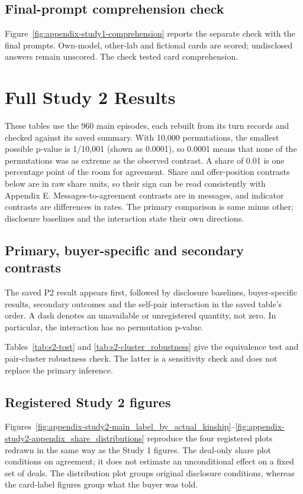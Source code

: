 \subsection{Final-prompt comprehension check}
\label{subapp:final-prompt-comprehension-check}
Figure~\ref{fig:appendix-study1-comprehension} reports the separate check with the final prompts. Own-model, other-lab and fictional cards are scored; undisclosed answers remain unscored. The check tested card comprehension.


\section{Full Study 2 Results}
\label{app:study2-results}
These tables use the 960 main episodes, each rebuilt from its turn records and checked against its saved summary. With 10,000 permutations, the smallest possible p-value is 1/10,001 (shown as 0.0001), so 0.0001 means that none of the permutations was as extreme as the observed contrast. A share of 0.01 is one percentage point of the room for agreement. Share and offer-position contrasts below are in raw share units, so their sign can be read consistently with Appendix E. Messages-to-agreement contrasts are in messages, and indicator contrasts are differences in rates. The primary comparison is same minus other; disclosure baselines and the interaction state their own directions.

\subsection{Primary, buyer-specific and secondary contrasts}
\label{subapp:primary-buyer-specific-and-secondary-contrasts}
The saved P2 result appears first, followed by disclosure baselines, buyer-specific results, secondary outcomes and the self-pair interaction in the saved table's order. A dash denotes an unavailable or unregistered quantity, not zero. In particular, the interaction has no permutation p-value.


Tables~\ref{tab:s2-tost} and \ref{tab:s2-cluster_robustness} give the equivalence test and pair-cluster robustness check. The latter is a sensitivity check and does not replace the primary inference.

\subsection{Registered Study 2 figures}
\label{subapp:registered-study-2-figures}
Figures~\ref{fig:appendix-study2-main_label_by_actual_kinship}--\ref{fig:appendix-study2-appendix_share_distributions} reproduce the four registered plots redrawn in the same way as the Study 1 figures. The deal-only share plot conditions on agreement; it does not estimate an unconditional effect on a fixed set of deals. The distribution plot groups original disclosure conditions, whereas the card-label figures group what the buyer was told.



